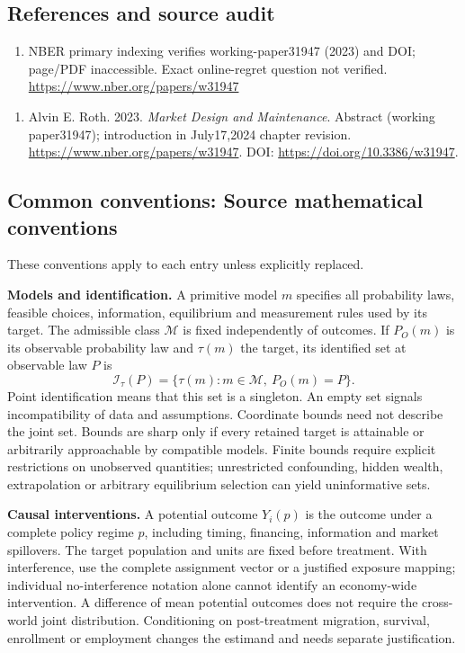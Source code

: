 \documentclass[11pt,a4paper]{article}
\begin{document}
\subsection*{References and source audit}
\begin{enumerate}
\item NBER primary indexing verifies working-paper31947 (2023) and DOI; page/PDF inaccessible. Exact online-regret question not verified. \url{https://www.nber.org/papers/w31947}
\end{enumerate}
\begin{enumerate}\raggedright
\item\hypertarget{definitions:source:30007581:1}{} Alvin E. Roth. 2023. \emph{Market Design and Maintenance}. Abstract (working paper31947); introduction in July17,2024 chapter revision.
\url{https://www.nber.org/papers/w31947}.
DOI: \url{https://doi.org/10.3386/w31947}.
\end{enumerate}

\subsection*{Common conventions: Source mathematical conventions}

These conventions apply to each entry unless explicitly replaced.

\textbf{Models and identification.} A primitive model \(m\) specifies all probability laws, feasible choices, information, equilibrium and measurement rules used by its target. The admissible class \(\mathcal M\) is fixed independently of outcomes. If \(P_O(m)\) is its observable probability law and \(\tau(m)\) the target, its identified set at observable law \(P\) is
\[
 \mathcal I_\tau(P)=\{\tau(m):m\in\mathcal M,\ P_O(m)=P\}.
\]
Point identification means that this set is a singleton. An empty set signals incompatibility of data and assumptions. Coordinate bounds need not describe the joint set. Bounds are sharp only if every retained target is attainable or arbitrarily approachable by compatible models. Finite bounds require explicit restrictions on unobserved quantities; unrestricted confounding, hidden wealth, extrapolation or arbitrary equilibrium selection can yield uninformative sets.

\textbf{Causal interventions.} A potential outcome \(Y_i(p)\) is the outcome under a complete policy regime \(p\), including timing, financing, information and market spillovers. The target population and units are fixed before treatment. With interference, use the complete assignment vector or a justified exposure mapping; individual no-interference notation alone cannot identify an economy-wide intervention. A difference of mean potential outcomes does not require the cross-world joint distribution. Conditioning on post-treatment migration, survival, enrollment or employment changes the estimand and needs separate justification.
\end{document}
